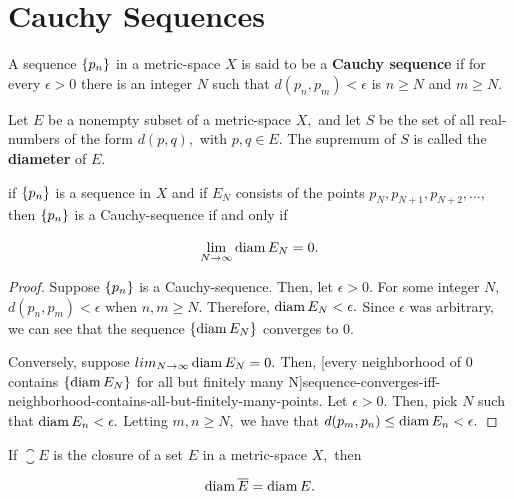 \documentclass{article}
\begin{document}
\section{Cauchy Sequences}

\begin{definition}
A \@{sequence} $\left\{ p_n \right\}$ in a \@{metric-space} $X$ is said to be a \textbf{Cauchy sequence} if for every $\epsilon > 0$ there is an \@{integer} $N$ such that $d(p_n, p_m) < \epsilon$ is $n \geq N$ and $m \geq N.$
\end{definition}

\begin{definition}[Diameter]
Let $E$ be a nonempty \@{subset} of a \@{metric-space} $X,$ and let $S$ be the \@{set} of all \@{real-numbers} of the form $d(p,q),$ with $p, q \in E.$ The \@{supremum} of $S$ is called the \textbf{diameter} of $E.$
\end{definition}

\begin{theorem}\label{limit-of-diameter-of-remaining-points-in-cauchy-sequence-is-zero}
if $\left\{ p_n \right\}$ is a \@{sequence} in $X$ and if $E_N$ consists of the \@{points} $p_N, p_{N+1}, p_{N+2}, \dots,$ then $\left\{ p_n \right\}$ is a \@{Cauchy-sequence} if and only if

\[ \lim_{N \to \infty} \operatorname{diam}{E_N} = 0. \]
\end{theorem}

\begin{proof}
Suppose $\left\{ p_n \right\}$ is a \@{Cauchy-sequence}. Then, let $\epsilon > 0.$ For some \@{integer} $N,$ $d(p_n, p_m) < \epsilon$ when $n, m \geq N.$ Therefore, $\operatorname{diam}{E_N} < \epsilon.$ Since $\epsilon$ was arbitrary, we can see that the sequence $\left\{ \operatorname{diam}{E_N} \right\}$ converges to $0.$

Conversely, suppose $lim_{N \to \infty} \operatorname{diam}{E_N} = 0.$ Then, \@[every neighborhood of $0$ contains $\left\{ \operatorname{diam}{E_N} \right\}$ for all but finitely many N]{sequence-converges-iff-neighborhood-contains-all-but-finitely-many-points}. Let $\epsilon > 0.$ Then, pick $N$ such that $\operatorname{diam}{E_n} < \epsilon.$ Letting $m, n \geq N,$ we have that $d(p_m, p_n) \leq \operatorname{diam}{E_n} < \epsilon.$
\end{proof}

\begin{theorem}\label{diameter-of-set-equals-diameter-of-closure}
If $\closure{E}$ is the \@{closure} of a \@{set} $E$ in a \@{metric-space} $X,$ then

\[ \operatorname{diam}{\overline{E}} = \operatorname{diam}{E}. \]
\end{theorem}
\end{document}
